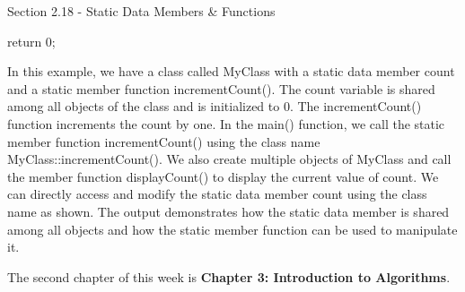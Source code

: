 \begin{notes}{Section 2.18 - Static Data Members \& Functions}
\begin{highlight}
\begin{code}[C++]
{        return 0;
    }
    \end{code}
        In this example, we have a class called MyClass with a static data member count and a static member function incrementCount(). The count variable is shared among all objects of the class and is initialized to 0. The incrementCount() function increments the count by one. In the main() function, we call the static member 
        function incrementCount() using the class name MyClass::incrementCount(). We also create multiple objects of MyClass and call the member function displayCount() to display the current value of count. We can directly access and modify the static data member count using the class name as shown. The output demonstrates how 
        the static data member is shared among all objects and how the static member function can be used to manipulate it.
    \end{highlight}
\end{notes}

The second chapter of this week is \textbf{Chapter 3: Introduction to Algorithms}.

